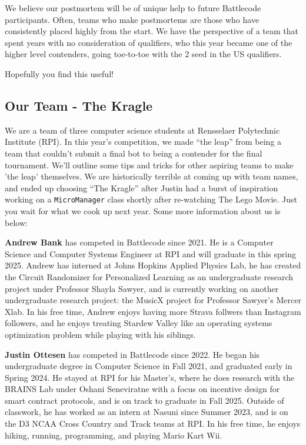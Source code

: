 We believe our postmortem will be of unique help to future Battlecode participants. Often, teams who make postmortems are those who have consistently placed highly from the start. We have the perspective of a team that spent years with no consideration of qualifiers, who this year became one of the higher level contenders, going toe-to-toe with the 2 seed in the US qualifiers.

\medskip

Hopefully you find this useful!

\subsection{Our Team - The Kragle}

We are a team of three computer science students at Rensselaer Polytechnic Institute (RPI). In this year's competition, we made ``the leap'' from being a team that couldn't submit a final bot to being a contender for the final tournament. We'll outline some tips and tricks for other aspiring teams to make 'the leap' themselves. We are historically terrible at coming up with team names, and ended up choosing ``The Kragle'' after Justin had a burst of inspiration working on a \verb|MicroManager| class shortly after re-watching The Lego Movie. Just you wait for what we cook up next year. Some more information about us is below:

\medskip

\textbf{Andrew Bank} has competed in Battlecode since 2021. He is a Computer Science and Computer Systems Engineer at RPI and will graduate in this spring 2025. Andrew has interned at Johns Hopkins Applied Physics Lab, he has created the Circuit Randomizer for Personalized Learning as an undergraduate research project under Professor Shayla Sawyer, and is currently working on another undergraduate research project: the MusicX project for Professor Sawyer's Mercer Xlab. In his free time, Andrew enjoys having more Strava follwers than Instagram followers, and he enjoys treating Stardew Valley like an operating systems optimization problem while playing with his siblings.

\medskip

\textbf{Justin Ottesen} has competed in Battlecode since 2022. He began his undergraduate degree in Computer Science in Fall 2021, and graduated early in Spring 2024. He stayed at RPI for his Master's, where he does research with the BRAINS Lab under Oshani Seneviratne with a focus on incentive design for smart contract protocols, and is on track to graduate in Fall 2025. Outside of classwork, he has worked as an intern at Nasuni since Summer 2023, and is on the D3 NCAA Cross Country and Track teams at RPI. In his free time, he enjoys hiking, running, programming, and playing Mario Kart Wii.

